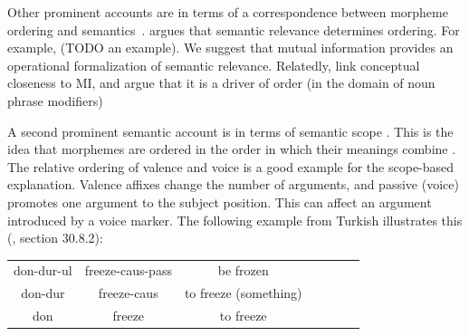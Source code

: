\documentclass[11pt,letterpaper]{article}
\newcommand{\citep}{\parencite}
\newcommand{\citet}{\Textcite}
\begin{document}



%






Other prominent accounts are in terms of a correspondence between morpheme ordering and semantics~\citep{bybee-morphology-1985,rice2000morpheme}.
\citet{bybee-morphology-1985} argues that semantic relevance determines ordering.
For example, (TODO an example).
We suggest that mutual information provides an operational formalization of semantic relevance.
Relatedly, \citep{culbertson2020from} link conceptual closeness to MI, and argue that it is a driver of order (in the domain of noun phrase modifiers)

A second prominent semantic account is in terms of semantic scope \citep{rice2000morpheme}.
This is the idea that morphemes are ordered in the order in which their meanings combine \citep[e.g.,][]{rice2000morpheme, caballero2010scope,  narrog2010the}.
The relative ordering of valence and voice is a good example for the scope-based explanation.
Valence affixes change the number of arguments, and passive (voice) promotes one argument to the subject position.
This can affect an argument introduced by a voice marker.
The following example from Turkish illustrates this (\cite{schaaik2020turkish}, section 30.8.2):


\begin{tabular}{ccccccc}
don-dur-ul & freeze-caus-pass & be frozen \\
don-dur & freeze-caus & to freeze (something) \\
don & freeze& to freeze \\
\end{tabular}
\end{document}
